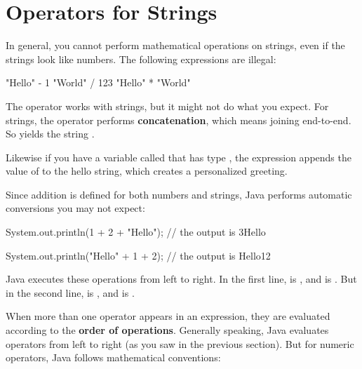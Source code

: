 \section{Operators for Strings}


In general, you cannot perform mathematical operations on strings, even if the strings look like numbers.
The following expressions are illegal:

\begin{code}
"Hello" - 1     "World" / 123     "Hello" * "World"
\end{code}


The \java{+} operator works with strings, but it might not do what you expect.
For strings, the \java{+} operator performs {\bf concatenation}, which means joining end-to-end.
So  yields the string .

Likewise if you have a variable called  that has type , the expression  appends the value of  to the hello string, which creates a personalized greeting.

Since addition is defined for both numbers and strings, Java performs automatic conversions you may not expect:

\begin{code}
System.out.println(1 + 2 + "Hello");
// the output is 3Hello

System.out.println("Hello" + 1 + 2);
// the output is Hello12
\end{code}

Java executes these operations from left to right.
In the first line,  is , and  is .
But in the second line,  is , and  is .




When more than one operator appears in an expression, they are evaluated according to the {\bf order of operations}.
Generally speaking, Java evaluates operators from left to right (as you saw in the previous section).
But for numeric operators, Java follows mathematical conventions:

